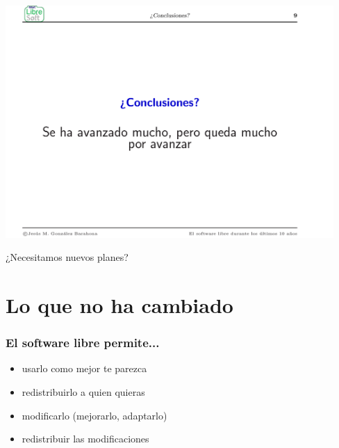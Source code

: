 \documentclass[17pt,aspectratio=169]{beamer}
\begin{document}
\begin{frame}

\begin{center}
  \includegraphics[width=12.5cm]{figs/transpas-10}
\end{center}  

\end{frame}

\begin{frame}

  \begin{center}
    {\Large
      ¿Necesitamos nuevos planes?
    }
  \end{center}
  
\end{frame}

\section{Lo que no ha cambiado}


\begin{frame}
\frametitle{El software libre permite...}

{\large
\begin{itemize}
\item usarlo como mejor te parezca
\item redistribuirlo a quien quieras
\item modificarlo (mejorarlo, adaptarlo)
\item redistribuir las modificaciones
\end{itemize}
}
\end{frame}
\end{document}

